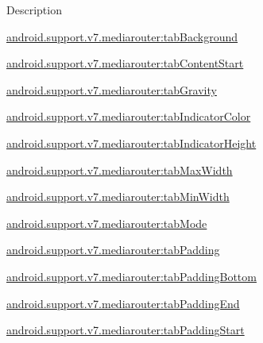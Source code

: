 Description 

{\ttfamily \hyperlink{classandroid_1_1support_1_1v7_1_1mediarouter_1_1R_1_1styleable_aacd8a2a688f5c215b79c9aec91e5e8ea}{android.\+support.\+v7.\+mediarouter\+:tab\+Background}}

{\ttfamily \hyperlink{classandroid_1_1support_1_1v7_1_1mediarouter_1_1R_1_1styleable_abfa3bc115c4d49ec7257d81e604f3830}{android.\+support.\+v7.\+mediarouter\+:tab\+Content\+Start}}

{\ttfamily \hyperlink{classandroid_1_1support_1_1v7_1_1mediarouter_1_1R_1_1styleable_a411d6e18585a008c7a903a5f997cfee4}{android.\+support.\+v7.\+mediarouter\+:tab\+Gravity}}

{\ttfamily \hyperlink{classandroid_1_1support_1_1v7_1_1mediarouter_1_1R_1_1styleable_afc512c65c0fbbdef2ba01c921bf019e7}{android.\+support.\+v7.\+mediarouter\+:tab\+Indicator\+Color}}

{\ttfamily \hyperlink{classandroid_1_1support_1_1v7_1_1mediarouter_1_1R_1_1styleable_a4886393baa84ceeef094b8f894bb3d42}{android.\+support.\+v7.\+mediarouter\+:tab\+Indicator\+Height}}

{\ttfamily \hyperlink{classandroid_1_1support_1_1v7_1_1mediarouter_1_1R_1_1styleable_aa303d2e4537be04bf5a1500e95eccfe5}{android.\+support.\+v7.\+mediarouter\+:tab\+Max\+Width}}

{\ttfamily \hyperlink{classandroid_1_1support_1_1v7_1_1mediarouter_1_1R_1_1styleable_aafab3ca12beb8f67f351f2a9588d9050}{android.\+support.\+v7.\+mediarouter\+:tab\+Min\+Width}}

{\ttfamily \hyperlink{classandroid_1_1support_1_1v7_1_1mediarouter_1_1R_1_1styleable_aac3d8271420cd633662292cba1169951}{android.\+support.\+v7.\+mediarouter\+:tab\+Mode}}

{\ttfamily \hyperlink{classandroid_1_1support_1_1v7_1_1mediarouter_1_1R_1_1styleable_a040d174a11be3d0c5f30bd26c52dca78}{android.\+support.\+v7.\+mediarouter\+:tab\+Padding}}

{\ttfamily \hyperlink{classandroid_1_1support_1_1v7_1_1mediarouter_1_1R_1_1styleable_a3ac9b6469877f1873d679bfb271f796b}{android.\+support.\+v7.\+mediarouter\+:tab\+Padding\+Bottom}}

{\ttfamily \hyperlink{classandroid_1_1support_1_1v7_1_1mediarouter_1_1R_1_1styleable_a4dcd3a733efad4f87d80f65b2a766010}{android.\+support.\+v7.\+mediarouter\+:tab\+Padding\+End}}

{\ttfamily \hyperlink{classandroid_1_1support_1_1v7_1_1mediarouter_1_1R_1_1styleable_a28354c7081791e6f352bb7b9963d4115}{android.\+support.\+v7.\+mediarouter\+:tab\+Padding\+Start}}

